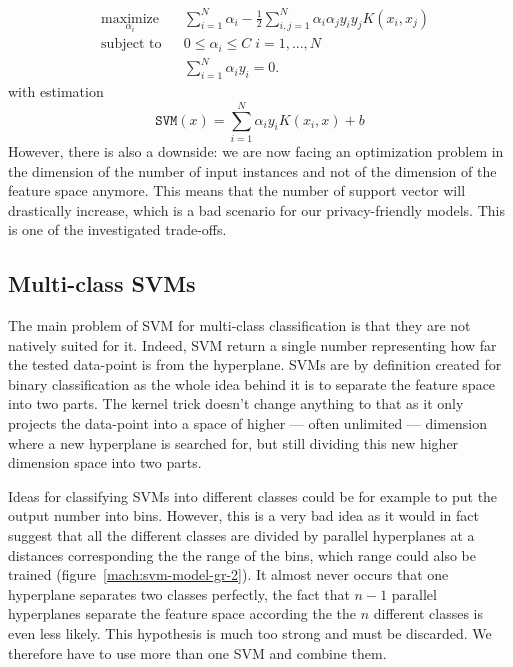 \begin{equation}
    \begin{aligned}
& \underset{\alpha_i}{\text{maximize}} 
& & \sum_{i=1}^N \alpha_i - \frac12 \sum_{i,j=1}^N \alpha_i \alpha_j y_i y_j K(x_i, x_j) \\
& \text{subject to}
& & 0 \leq \alpha_i \leq C \; i = 1, \ldots, N \\
& 
& & \sum_{i=1}^N\alpha_i y_i = 0.
\end{aligned}
\end{equation}
with estimation
\begin{equation}
    \mathtt{SVM}(x) = \sum_{i=1}^N \alpha_i y_i K(x_i,x) + b
\end{equation}
However, there is also a downside: we are now facing an optimization problem in the dimension of the number of input instances and not of the dimension of the feature space anymore. This means that the number of support vector will drastically increase, which is a bad scenario for our privacy-friendly models. This is one of the investigated trade-offs.







\subsection{Multi-class SVMs}
The main problem of SVM for multi-class classification is that they are not natively suited for it. Indeed, SVM return a single number representing how far the tested data-point is from the hyperplane. SVMs are by definition created for binary classification as the whole idea behind it is to separate the feature space into two parts. The kernel trick doesn't change anything to that as it only projects the data-point into a space of higher --- often unlimited --- dimension where a new hyperplane is searched for, but still dividing this new higher dimension space into two parts.

Ideas for classifying SVMs into different classes could be for example to put the output number into bins. However, this is a very bad idea as it would in fact suggest that all the different classes are divided by parallel hyperplanes at a distances corresponding the the range of the bins, which range could also be trained (figure~\ref{mach:svm-model-gr-2}). It almost never occurs that one hyperplane separates two classes perfectly, the fact that $n-1$ parallel hyperplanes separate the feature space according the the $n$ different classes is even less likely. This hypothesis is much too strong and must be discarded. We therefore have to use more than one SVM and combine them.


